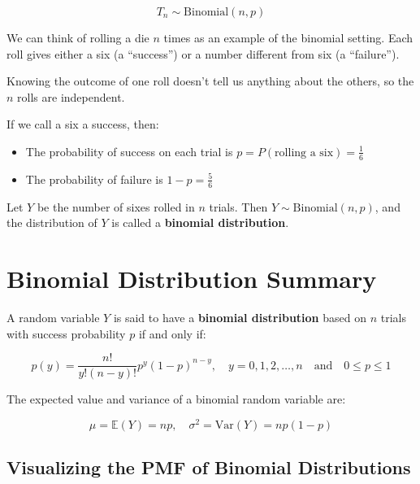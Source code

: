 \[
T_n \sim \text{Binomial}(n, p)
\]
\medskip
\begin{tcolorbox}[title=Example: Binomial Distribution from Die Rolls,
  colback=blue!5, colframe=blue!40!black, coltitle=black,
  colbacktitle=blue!10!white, fonttitle=\bfseries, breakable]

We can think of rolling a die \( n \) times as an example of the binomial setting. Each roll gives either a six (a “success”) or a number different from six (a “failure”).

Knowing the outcome of one roll doesn’t tell us anything about the others, so the \( n \) rolls are independent.

If we call a six a success, then:
\begin{itemize}
  \item The probability of success on each trial is \( p = P(\text{rolling a six}) = \frac{1}{6} \)
  \item The probability of failure is \( 1 - p = \frac{5}{6} \)
\end{itemize}

Let \( Y \) be the number of sixes rolled in \( n \) trials. Then \( Y \sim \text{Binomial}(n, p) \), and the distribution of \( Y \) is called a \textbf{binomial distribution}.
\end{tcolorbox}


\section{Binomial Distribution Summary} %

A random variable \( Y \) is said to have a \textbf{binomial distribution} based on \( n \) trials with success probability \( p \) if and only if:

\[
p(y) = \frac{n!}{y!(n - y)!} p^y (1 - p)^{n - y}, \quad y = 0, 1, 2, \dots, n \quad \text{and} \quad 0 \leq p \leq 1
\]

\medskip

The expected value and variance of a binomial random variable are:

\[
\mu = \mathbb{E}(Y) = np, \quad \sigma^2 = \mathrm{Var}(Y) = np(1 - p)
\]

\subsection{Visualizing the PMF of Binomial Distributions}

